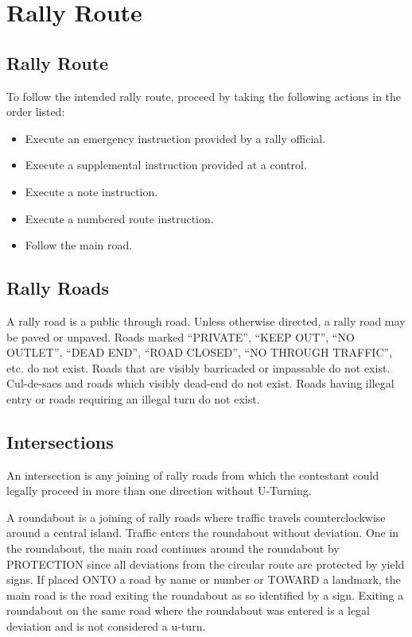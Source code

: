 \section{Rally Route}

\subsection{Rally Route}
To follow the intended rally route, proceed by taking the following actions in the order listed:

\begin{itemize}

\item Execute an emergency instruction provided by a rally official.

\item Execute a supplemental instruction provided at a control.

\item Execute a note instruction.

\item Execute a numbered route instruction.

\item Follow the main road.

\end{itemize}

\subsection{Rally Roads}
A rally road is a public through road.  Unless otherwise directed, a rally road may be paved or unpaved.  Roads marked ``PRIVATE'', ``KEEP OUT'', ``NO OUTLET'', ``DEAD END'', ``ROAD CLOSED'', ``NO THROUGH TRAFFIC'', etc. do not exist.  Roads that are visibly barricaded or impassable do not exist.  Cul-de-sacs and roads which visibly dead-end do not exist.  Roads having illegal entry or roads requiring an illegal turn do not exist.

\subsection{Intersections}
An intersection is any joining of rally roads from which the contestant could legally proceed in more than one direction without U-Turning.

A roundabout is a joining of rally roads where traffic travels counterclockwise around a central island.  Traffic enters the roundabout without deviation.  One in the roundabout, the main road continues around the roundabout by PROTECTION since all deviations from the circular route are protected by yield signs.  If placed ONTO a road by name or number or TOWARD a landmark, the main road is the road exiting the roundabout as so identified by a sign.  Exiting a roundabout on the same road where the roundabout was entered is a legal deviation and is not considered a u-turn.

